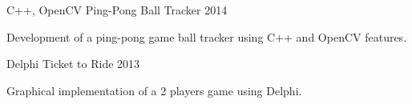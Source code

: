 \begin{cventries}
  \cventry
    {C++, OpenCV} %
    {Ping-Pong Ball Tracker} %
    {} %
    {2014} %
    {
      \begin{cvitems} %
        \item {Development of a ping-pong game ball tracker using C++ and OpenCV features.}
      \end{cvitems}
    }

  \cventry
    {Delphi} %
    {Ticket to Ride} %
    {} %
    {2013} %
    {
      \begin{cvitems} %
        \item {Graphical implementation of a 2 players game using Delphi.}
      \end{cvitems}
    }

\end{cventries}
